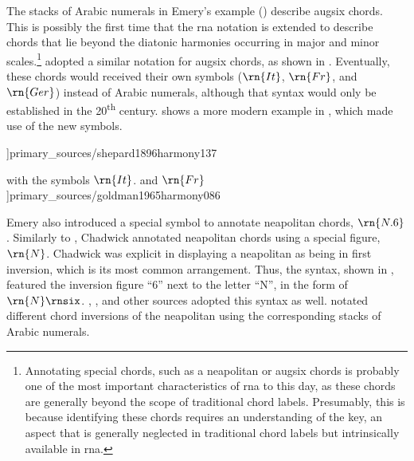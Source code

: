 


The stacks of Arabic numerals in Emery's example
() describe
\gls{augsix} chords. This is possibly the first time that
the \gls{rna} notation is extended to describe chords that
lie beyond the diatonic harmonies occurring in major and
minor scales.\footnote{Annotating special chords, such as a
\gls{neapolitan} or \gls{augsix} chords is probably one of
the most important characteristics of \gls{rna} to this day,
as these chords are generally beyond the scope of
traditional chord labels. Presumably, this is because
identifying these chords requires an understanding of the
key, an aspect that is generally neglected in traditional
chord labels but intrinsically available in \gls{rna}.}
\textcite{shepard1896harmony} adopted a similar notation for
\gls{augsix} chords, as shown in
. Eventually,
these chords would received their own symbols ($\rn{It}$,
$\rn{Fr}$, and $\rn{Ger}$) instead of Arabic numerals,
although that syntax would only be established in the
20\textsuperscript{th} century.
 shows a more
modern example in \textcite{goldman1965harmony}, which made
use of the new symbols.

\phdfigure[Augmented sixth chords in
\textcite[137]{shepard1896harmony}]{primary_sources/shepard1896harmony137}

\phdfigure[Augmented sixth chords in
\textcite[86]{goldman1965harmony} with the symbols
$\rn{It}$. and
$\rn{Fr}$]{primary_sources/goldman1965harmony086}

Emery also introduced a special symbol to annotate
\gls{neapolitan} chords, $\rn{N.6}$. Similarly to
\textcite{emery1879elements}, Chadwick annotated
\gls{neapolitan} chords using a special figure, $\rn{N}$.
Chadwick was explicit in displaying a \gls{neapolitan} as
being in first inversion, which is its most common
arrangement. Thus, the syntax, shown in
, featured
the inversion figure ``6'' next to the letter ``N'', in the
form of $\rn{N}\rnsix$. \textcite{heacox1907lessons},
\textcite{alchin1921applied}, and other sources adopted this
syntax as well. \textcite{heacox1907lessons} notated
different chord inversions of the \gls{neapolitan} using the
corresponding stacks of Arabic numerals.

